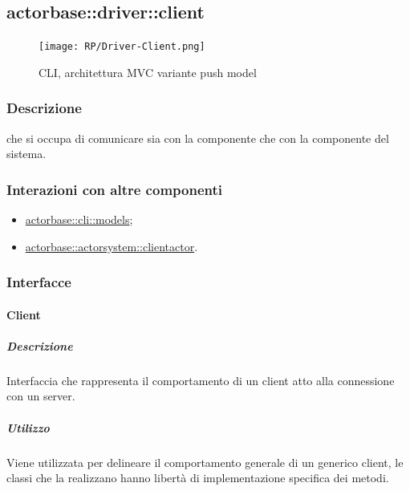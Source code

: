 \documentclass{scalatekids-article}
\begin{document}
\subsection{actorbase::driver::client}
\label{sec:actorbase::driver::client}

\begin{figure}[H]
  \begin{center}
    \texttt{[image: RP/Driver-Client.png]}
    \caption{CLI, architettura MVC variante push model}
  \end{center}
\end{figure}

\subsubsection{Descrizione}

 che si occupa di comunicare sia con la componente 
che con la componente  del sistema.

\subsubsection{Interazioni con altre componenti}

\begin{itemize}
\item \hyperref[sec:actorbase::cli::models]{actorbase::cli::models};
\item \hyperref[sec:actorbase::actorsystem::clientactor]{actorbase::actorsystem::clientactor}.
\end{itemize}

\subsubsection{Interfacce}

\paragraph{Client}
\label{sec:Client}

\subparagraph{Descrizione}

Interfaccia che rappresenta il comportamento di un client atto alla connessione con un server.

\subparagraph{Utilizzo}

Viene utilizzata per delineare il comportamento generale di un generico client,
le classi che la realizzano hanno libertà di implementazione specifica dei
metodi.
\end{document}
